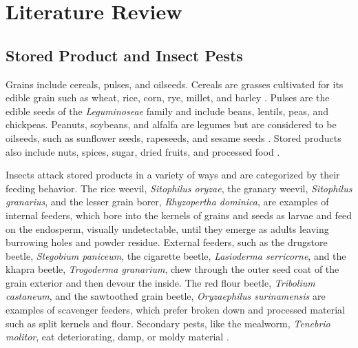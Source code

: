 \chapter{Literature Review}


\section{Stored Product and Insect Pests}

Grains include cereals, pulses, and oilseeds. Cereals are grasses cultivated for its edible grain such as wheat, rice, corn, rye, millet, and barley \cite{awikaMajorCerealGrains2011}. Pulses are the edible seeds of the \textit{Leguminoseae} family and include beans, lentils, peas, and chickpeas. Peanuts, soybeans, and alfalfa are legumes but are considered to be oilseeds, such as sunflower seeds, rapeseeds, and sesame seeds \cite{sathiyaseelanMajorInsectPests2022}. Stored products also include nuts, spices, sugar, dried fruits, and processed food \cite{neethirajanDetectionTechniquesStoredProduct2007}.

Insects attack stored products in a variety of ways and are categorized by their feeding behavior. The rice weevil, \textit{Sitophilus oryzae}, the granary weevil, \textit{Sitophilus granarius}, and the lesser grain borer, \textit{Rhyzopertha dominica}, are examples of internal feeders, which bore into the kernels of grains and seeds as larvae and feed on the endosperm, visually undetectable, until they emerge as adults leaving burrowing holes and powder residue. External feeders, such as the drugstore beetle, \textit{Stegobium paniceum}, the cigarette beetle, \textit{Lasioderma serricorne}, and the khapra beetle, \textit{Trogoderma granarium}, chew through the outer seed coat of the grain exterior and then devour the inside. The red flour beetle, \textit{Tribolium castaneum}, and the sawtoothed grain beetle, \textit{Oryzaephilus surinamensis} are examples of scavenger feeders, which prefer broken down and processed material such as split kernels and flour. Secondary pests, like the mealworm, \textit{Tenebrio molitor}, eat deteriorating, damp, or moldy material \cite{bennettTrumansScientificGuide1988}.

